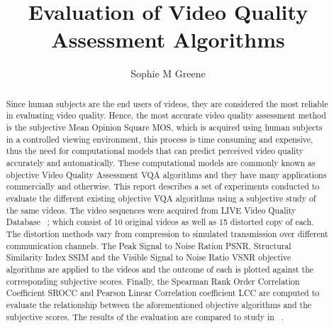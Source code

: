 \documentclass{article}
\begin{document}
\title{Evaluation of Video Quality Assessment Algorithms}
\author{Sophie M Greene}

\maketitle

\begin{abstract}
Since human subjects are the end users of videos, they are considered the most reliable in evaluating video quality. Hence, the most accurate video quality assessment method is the subjective Mean Opinion Square MOS, which is acquired using human subjects in a controlled viewing environment, this process is time consuming and expensive, thus the need for computational models that can predict perceived video quality accurately and automatically. These computational models are commonly known as objective Video Quality Assessment VQA algorithms and they have many applications commercially and otherwise.
This report describes a set of experiments conducted to evaluate the different existing objective VQA algorithms using a subjective study of the same videos. The video sequences were acquired from LIVE Video Quality Database ~\cite{kalp2010a,kalp2010b}; which consist of 10 original videos as well as 15 distorted copy of each. The distortion methods vary from compression to simulated transmission over different communication channels. The Peak Signal to Noise Ration PSNR, Structural Similarity Index SSIM and the Visible Signal to Noise Ratio VSNR objective algorithms are applied to the videos and the outcome of each is plotted against the corresponding subjective scores. Finally, the Spearman Rank Order Correlation Coefficient SROCC and Pearson Linear Correlation coefficient LCC are computed to evaluate the relationship between the aforementioned objective algorithms and the subjective scores. The results of the evaluation are compared to study in ~\cite{kalp2010a,kalp2010b}.
\end{abstract}
\end{document}
